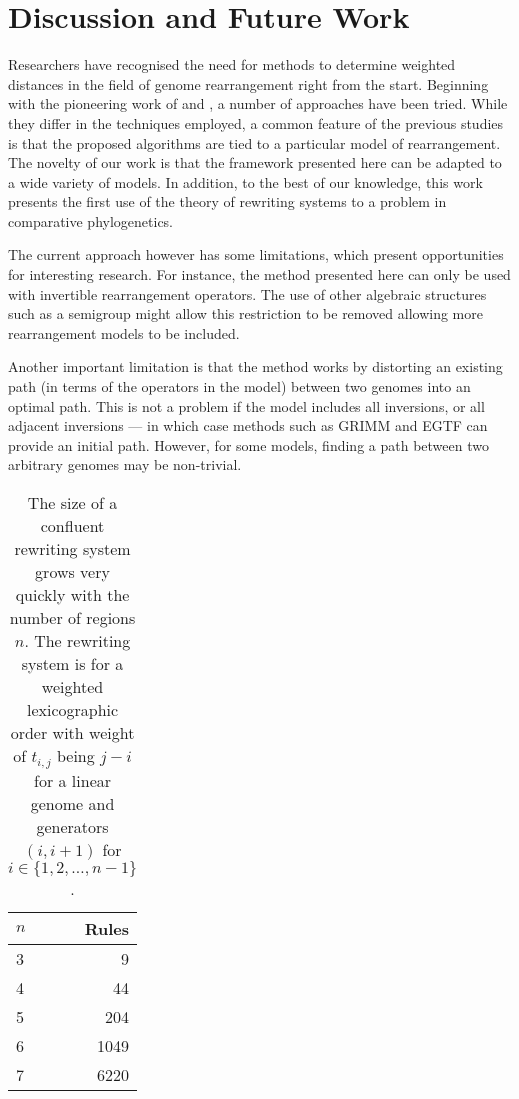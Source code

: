 \documentclass[utf8]{Frontiers_LaTex_Templates/frontiersFPHY} %
\numberwithin{equation}{section}
\begin{document}
\section{Discussion and Future Work}
\label{sec:future}
Researchers have recognised the need for methods to determine weighted distances in the field of genome rearrangement right from the start. Beginning with the pioneering work of \citet{sankoff1992edit} and \citet{sankoff1992gene}, a number of approaches have been tried. While they differ in the techniques employed, a common feature of the previous studies is that the proposed algorithms are  tied to a particular model of rearrangement. The novelty of our work is that the framework presented here can be adapted to a wide variety of models. In addition, to the best of our knowledge, this work presents the first use of the theory of rewriting systems to a problem in comparative phylogenetics. 

The current approach however has some limitations, which present opportunities for interesting research.  For instance, the method presented here can only be used  with invertible rearrangement operators. The use of other algebraic structures such as a semigroup might allow this restriction to be removed allowing more rearrangement models to be included.

Another important limitation is that the method works by distorting an existing path (in terms of the operators in the model) between two genomes into an optimal path.  This is not a problem if the model includes all inversions, or all adjacent inversions --- in which case methods such as GRIMM and EGTF can provide an initial path. 
However, for some models, finding a path between two arbitrary genomes may be non-trivial. 

\begin{table}[h!]
  \centering
  \begin{tabular}{lr}
  \toprule
  $n$ &   Rules \\
  \midrule
  3 & 9 \\
  4 & 44  \\
  5 & 204 \\
  6 & 1049 \\
  7 & 6220 \\
  \end{tabular}
  \caption[Number of rewriting rules]{The size of a confluent rewriting system grows very quickly with the number of regions $n$. The rewriting system is for a weighted lexicographic order with weight of $t_{i,j}$ being $j-i$ for a linear genome and generators $(i, i + 1)$ for $i \in \{1, 2, \dots, n - 1\}$. }\label{table:numrules}
\end{table}
\end{document}
